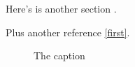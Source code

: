 %
%
%
%


\startdocument			%
%
%

Here's is another section \label{second}.

%
%
Plus another reference \ref{first}.

\begin{figure}
\caption{The caption}
\end{figure}

%
%

